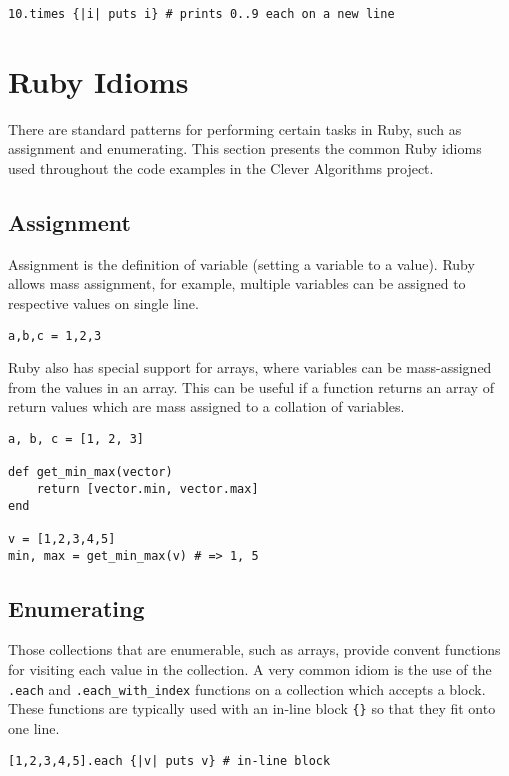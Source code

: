 \begin{bibunit}
\begin{lstlisting}
10.times {|i| puts i} # prints 0..9 each on a new line
\end{lstlisting}

% 
% 
\section{Ruby Idioms}
There are standard patterns for performing certain tasks in Ruby, such as assignment and enumerating. This section presents the common Ruby idioms used throughout the code examples in the Clever Algorithms project.

\subsection{Assignment}
Assignment is the definition of variable (setting a variable to a value). Ruby allows mass assignment, for example, multiple variables can be assigned to respective values on single line.

\begin{lstlisting}
a,b,c = 1,2,3
\end{lstlisting}

Ruby also has special support for arrays, where variables can be mass-assigned from the values in an array. This can be useful if a function returns an array of return values which are mass assigned to a collation of variables.

\begin{lstlisting}
a, b, c = [1, 2, 3]

def get_min_max(vector)
	return [vector.min, vector.max]
end

v = [1,2,3,4,5]
min, max = get_min_max(v) # => 1, 5
\end{lstlisting}

\subsection{Enumerating}
Those collections that are enumerable, such as arrays, provide convent functions for visiting each value in the collection. A very common idiom is the use of the \texttt{.each} and \texttt{.each\_with\_index} functions on a collection which accepts a block. These functions are typically used with an in-line block \texttt{\{\}} so that they fit onto one line.

\begin{lstlisting}
[1,2,3,4,5].each {|v| puts v} # in-line block


\end{lstlisting}
\end{bibunit}
